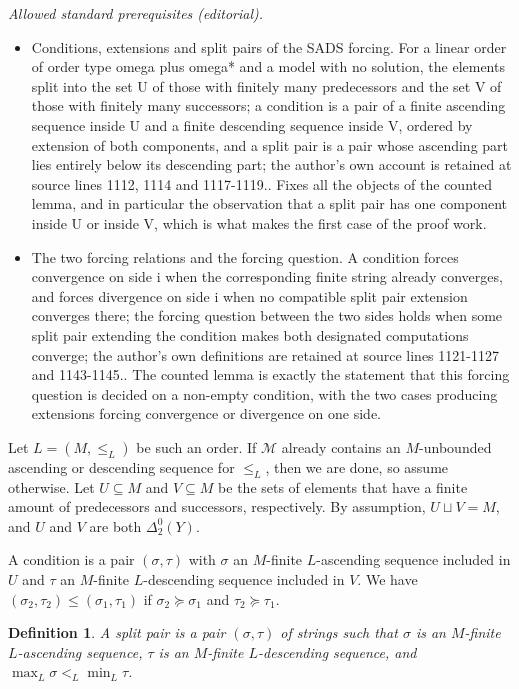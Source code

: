 \documentclass{article}
\numberwithin{theorem}{section}
\newtheorem{definition}[theorem]{Definition}
\newcommand{\M}{\mathcal{M}}
\begin{document}
\noindent\textit{Allowed standard prerequisites (editorial).}\begin{itemize}
\item Conditions, extensions and split pairs of the SADS forcing. For a linear order of order type omega plus omega* and a model with no solution, the elements split into the set U of those with finitely many predecessors and the set V of those with finitely many successors; a condition is a pair of a finite ascending sequence inside U and a finite descending sequence inside V, ordered by extension of both components, and a split pair is a pair whose ascending part lies entirely below its descending part; the author's own account is retained at source lines 1112, 1114 and 1117-1119.. Fixes all the objects of the counted lemma, and in particular the observation that a split pair has one component inside U or inside V, which is what makes the first case of the proof work.
\item The two forcing relations and the forcing question. A condition forces convergence on side i when the corresponding finite string already converges, and forces divergence on side i when no compatible split pair extension converges there; the forcing question between the two sides holds when some split pair extending the condition makes both designated computations converge; the author's own definitions are retained at source lines 1121-1127 and 1143-1145.. The counted lemma is exactly the statement that this forcing question is decided on a non-empty condition, with the two cases producing extensions forcing convergence or divergence on one side.
\end{itemize}\medskip
Let $L = (M, \leq_L)$ be such an order. If $\M$ already contains an $M$-unbounded ascending or descending sequence for $\leq_L$, then we are done, so assume otherwise. Let $U \subseteq M$ and $V \subseteq M$ be the sets of elements that have a finite amount of predecessors and successors, respectively. By assumption, $U \sqcup V = M$, and $U$ and $V$ are both $\Delta^0_2(Y)$.

A condition is a pair $(\sigma, \tau)$ with $\sigma$ an $M$-finite $L$-ascending sequence included in $U$ and $\tau$ an $M$-finite $L$-descending sequence included in $V$. We have $(\sigma_2, \tau_2) \leq (\sigma_1, \tau_1)$ if $\sigma_2 \succeq \sigma_1$ and $\tau_2 \succeq \tau_1$.

\begin{definition}
A \emph{split pair} is a pair $(\sigma, \tau)$ of strings such that $\sigma$ is an $M$-finite $L$-ascending sequence, $\tau$ is an $M$-finite $L$-descending sequence, and $\max_L \sigma <_L \min_L \tau$.
\end{definition}
\end{document}
